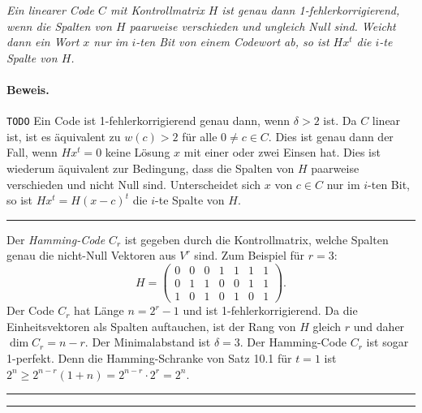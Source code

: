 \documentclass[9pt]{article}
\begin{document}
\begin{satz}
\textit{Ein linearer Code $C$ mit Kontrollmatrix $H$ ist genau dann 1-fehlerkorrigierend, wenn die Spalten von $H$ paarweise verschieden und ungleich Null sind.  
Weicht dann ein Wort $x$ nur im $i$-ten Bit von einem Codewort ab, so ist $H x^t$ die $i$-te Spalte von $H$.  }

\paragraph{Beweis.}  \texttt{TODO}
Ein Code ist 1-fehlerkorrigierend genau dann, wenn $\delta > 2$ ist. Da $C$ linear ist, ist es äquivalent zu $w(c) > 2$ für alle $0 \neq c \in C$. Dies ist genau dann der Fall, wenn $H x^t = 0$ keine Lösung $x$ mit einer oder zwei Einsen hat. Dies ist wiederum äquivalent zur Bedingung, dass die Spalten von $H$ paarweise verschieden und nicht Null sind.  
Unterscheidet sich $x$ von $c \in C$ nur im $i$-ten Bit, so ist $H x^t = H (x - c)^t$ die $i$-te Spalte von $H$.  
 \end{satz} \noindent \rule{8cm}{0.4pt}

\begin{bsp}
Der\textit{ Hamming-Code} $C_r$ ist gegeben durch die Kontrollmatrix, welche Spalten genau die nicht-Null Vektoren aus $V^r$ sind. Zum Beispiel für $r = 3$:  
\[
H = \begin{pmatrix}
0 & 0 & 0 & 1 & 1 & 1 & 1 \\
0 & 1 & 1 & 0 & 0 & 1 & 1 \\ 
1 & 0 & 1 & 0 & 1 & 0 & 1
\end{pmatrix}.
\]
Der Code $C_r$ hat Länge $n = 2^r - 1$ und ist 1-fehlerkorrigierend. Da die Einheitsvektoren als Spalten auftauchen, ist der Rang von $H$ gleich $r$ und daher $\dim C_r = n - r$. Der Minimalabstand ist $\delta = 3$.  
Der Hamming-Code $C_r$ ist sogar 1-perfekt. Denn die Hamming-Schranke von Satz 10.1 für $t = 1$ ist $2^n \geq 2^{n-r}(1 + n) = 2^{n-r} \cdot 2^r = 2^n$.  
\end{bsp} \noindent \rule{8cm}{0.4pt}
\color{Blue}
\begin{bsp}
\end{bsp} \noindent \rule{8cm}{0.4pt}
\color{black}
\end{document}
